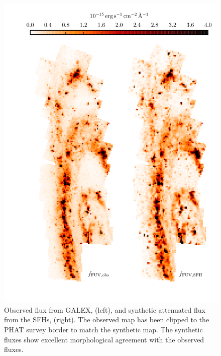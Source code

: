 \documentclass[iop, tighten]{emulateapj}
\begin{document}
\begin{figure}
\centering
\includegraphics[scale=0.9]{m31flux-figures/fluxmaps_fuv.pdf}
\caption[Observed and synthetic attenuated \fuv{} flux maps.]{Observed \fuv{} flux from
    GALEX, \ffuvobs{} (left), and synthetic attenuated \fuv{} flux from the
    SFHs, \ffuvsfh{} (right). The observed map has been clipped to the PHAT
    survey border to match the synthetic map. The synthetic fluxes show
    excellent morphological agreement with the observed fluxes.
}
\label{fig:mfx:fluxmaps_fuv}
\end{figure}
\end{document}

